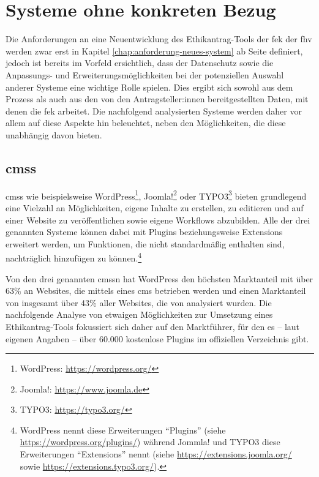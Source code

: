 \documentclass[a4paper,12pt,twoside,numbers=noendperiod]{scrreprt}
\begin{document}
\section{Systeme ohne konkreten Bezug}
\label{sec:systeme-ohne-bezug}

Die Anforderungen an eine Neuentwicklung des Ethikantrag-Tools der \ac{fek} der \ac{fhv} werden zwar erst in Kapitel \ref{chap:anforderung-neues-system} ab Seite \pageref{chap:anforderung-neues-system} definiert, jedoch ist bereits im Vorfeld ersichtlich, dass der Datenschutz sowie die Anpassungs- und Erweiterungsmöglichkeiten bei der potenziellen Auswahl anderer Systeme eine wichtige Rolle spielen. Dies ergibt sich sowohl aus dem Prozess als auch aus den von den Antragsteller:innen bereitgestellten Daten, mit denen die \acl{fek} arbeitet. Die nachfolgend analysierten Systeme werden daher vor allem auf diese Aspekte hin beleuchtet, neben den Möglichkeiten, die diese unabhängig davon bieten.

\subsection{\aclp{cms}}
\label{sub-sec:cms-syteme}

\acp{cms} wie beispielsweise WordPress\footnote{WordPress: \url{https://wordpress.org/}}, Joomla!\footnote{Joomla!: \url{https://www.joomla.de}} oder TYPO3\footnote{TYPO3: \url{https://typo3.org/}} bieten grundlegend eine Vielzahl an Möglichkeiten, eigene Inhalte zu erstellen, zu editieren und auf einer Website zu veröffentlichen sowie eigene Workflows abzubilden. \cite{oracle_corporation_who_2022} Alle der drei genannten Systeme können dabei mit Plugins beziehungsweise Extensions erweitert werden, um Funktionen, die nicht standardmäßig enthalten sind, nachträglich hinzufügen zu können.\footnote{WordPress nennt diese Erweiterungen \enquote{Plugins} (siehe \url{https://wordpress.org/plugins/}) während Jommla! und TYPO3 diese Erweiterungen \enquote{Extensions} nennt (siehe \url{https://extensions.joomla.org/} sowie \url{https://extensions.typo3.org/}).}

\medskip

Von den drei genannten \aclp{cms}n hat WordPress den höchsten Marktanteil mit über 63\% an Websites, die mittels eines \ac{cms} betrieben werden und einen Marktanteil von insgesamt über 43\% aller Websites, die von \cite{q-success_di_gelbmann_gmbh_usage_2023} analysiert wurden. Die nachfolgende Analyse von etwaigen Möglichkeiten zur Umsetzung eines Ethikantrag-Tools fokussiert sich daher auf den Marktführer, für den es -- laut eigenen Angaben \cite{wordpress_foundation_wordpress_2023} -- über 60.000 kostenlose Plugins im offiziellen Verzeichnis gibt.
\end{document}
